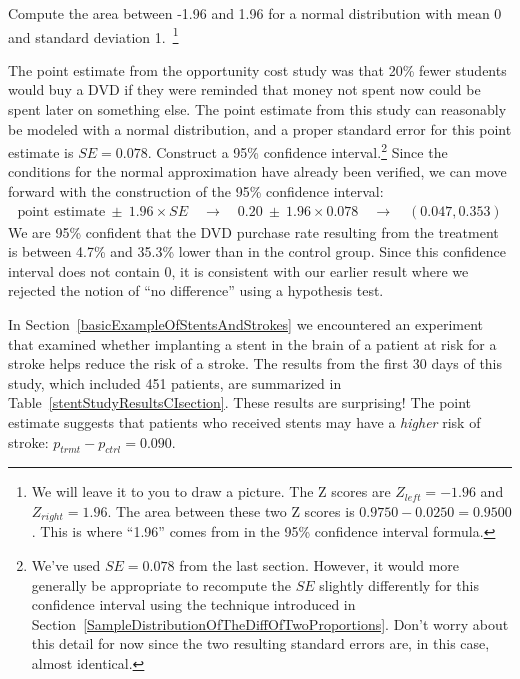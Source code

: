 \begin{exercise}
Compute the area between -1.96 and 1.96 for a normal distribution with mean 0 and standard deviation 1.~\footnote{We will leave it to you to draw a picture. The Z scores are $Z_{left} = -1.96$ and $Z_{right} = 1.96$. The area between these two Z scores is $0.9750 - 0.0250 = 0.9500$. This is where ``1.96'' comes from in the 95\% confidence interval formula.}
\end{exercise}

\begin{example}{The point estimate from the opportunity cost study was that 20\% fewer students would buy a DVD if they were reminded that money not spent now could be spent later on something else. The point estimate from this study can reasonably be modeled with a normal distribution, and a proper standard error for this point estimate is $SE = 0.078$. Construct a 95\% confidence interval.\footnote{We've used $SE = 0.078$ from the last section. However, it would more generally be appropriate to recompute the $SE$ slightly differently for this confidence interval using the technique introduced in Section~\ref{SampleDistributionOfTheDiffOfTwoProportions}. Don't worry about this detail for now since the two resulting standard errors are, in this case, almost identical.}}
Since the conditions for the normal approximation have already been verified, we can move forward with the construction of the 95\% confidence interval:
\begin{align*}
\text{point estimate}\ \pm\ 1.96 \times SE \quad \rightarrow \quad
0.20\ \pm\ 1.96 \times 0.078 \quad \rightarrow \quad
(0.047, 0.353)
\end{align*}
We are 95\% confident that the DVD purchase rate resulting from the treatment is between 4.7\% and 35.3\% lower than in the control group. Since this confidence interval does not contain 0, it is consistent with our earlier result where we rejected the notion of ``no difference'' using a hypothesis test.
\end{example}

In Section~\ref{basicExampleOfStentsAndStrokes} we encountered an experiment that examined whether implanting a stent in the brain of a patient at risk for a stroke helps reduce the risk of a stroke. The results from the first 30 days of this study, which included 451 patients, are summarized in Table~\ref{stentStudyResultsCIsection}. These results are surprising! The point estimate suggests that patients who received stents may have a \emph{higher} risk of stroke: $p_{trmt} - p_{ctrl} = 0.090$.

